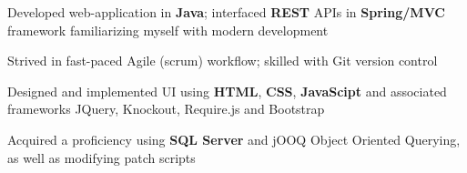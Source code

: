 \documentclass[letterpaper]{deedy-resume} %
\begin{document}
\begin{minipage}[t]{0.66\textwidth}
\vspace{10pt}
\begin{tightitemize}
\vspace{-9pt}
\item Developed web-application in \textbf{Java}; interfaced \textbf{REST} APIs  in \textbf{Spring/MVC} framework  familiarizing myself with modern development
 
\item Strived in fast-paced Agile (scrum) workflow; skilled with Git version control 

\item Designed and implemented UI using \textbf{HTML}, \textbf{CSS}, \textbf{JavaScipt} and associated frameworks JQuery, Knockout, Require.js and Bootstrap 



\item Acquired a proficiency using \textbf{SQL Server} and jOOQ Object Oriented Querying, as well as modifying patch scripts














\end{tightitemize}
\end{minipage}
\end{document}
